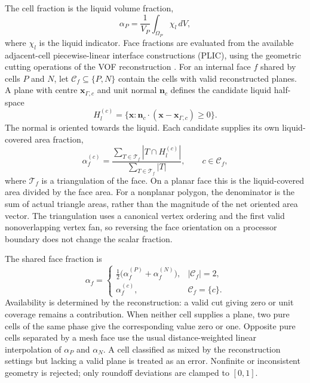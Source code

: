 \documentclass[final,12pt,nopreprintline,longtitle]{elsarticle}
\newcommand{\x}{\mathbf{x}}
\begin{document}
The cell fraction is the liquid volume fraction,
\begin{equation}
    \alpha_P=\frac{1}{V_P}\int_{\Omega_P}\chi_l\,dV,
    \label{eq:geometricFractions}
\end{equation}
where $\chi_l$ is the liquid indicator.  Face fractions are evaluated from the
available adjacent-cell piecewise-linear interface constructions (PLIC), using
the geometric cutting operations of the VOF reconstruction
\cite{Roenby2016,Scheufler2019,Liu2023incons}.
For an internal face $f$ shared by cells $P$ and $N$, let
$\mathcal C_f\subseteq\{P,N\}$ contain the cells with valid reconstructed
planes.  A plane with centre $\x_{\Gamma,c}$ and unit normal $\mathbf n_c$
defines the candidate liquid half-space
\[
    H_l^{(c)}
    =\{\x:\mathbf n_c\cdot(\x-\x_{\Gamma,c})\geq 0\}.
\]
The normal is oriented towards the liquid.  Each candidate supplies its own
liquid-covered area fraction,
\begin{equation}
    \alpha_f^{(c)}
    =\frac{\displaystyle\sum_{T\in\mathcal T_f}
                |T\cap H_l^{(c)}|}
           {\displaystyle\sum_{T\in\mathcal T_f}|T|},
    \qquad c\in\mathcal C_f ,
    \label{eq:candidateFaceFraction}
\end{equation}
where $\mathcal T_f$ is a triangulation of the face.  On a planar face this is
the liquid-covered area divided by the face area.  For a nonplanar polygon,
the denominator is the sum of actual triangle areas, rather than the
magnitude of the net oriented area vector.  The triangulation uses a canonical
vertex ordering and the first valid nonoverlapping vertex fan, so reversing
the face orientation on a processor boundary does not change the scalar
fraction.

The shared face fraction is
\begin{equation}
    \alpha_f=
    \begin{cases}
        \tfrac12\bigl(\alpha_f^{(P)}+\alpha_f^{(N)}\bigr),
            & |\mathcal C_f|=2,\\
        \alpha_f^{(c)}, & \mathcal C_f=\{c\}.
    \end{cases}
    \label{eq:averagedFaceFraction}
\end{equation}
Availability is determined by the reconstruction: a valid cut giving zero
or unit coverage remains a contribution.  When neither cell supplies a
plane, two pure cells of the same phase give the corresponding value zero
or one.  Opposite pure cells separated by a mesh face use the usual
distance-weighted linear interpolation of $\alpha_P$ and $\alpha_N$.
A cell classified as mixed by the reconstruction settings but lacking a
valid plane is treated as an error.  Nonfinite or inconsistent geometry is
rejected; only roundoff deviations are clamped to $[0,1]$.
\end{document}
